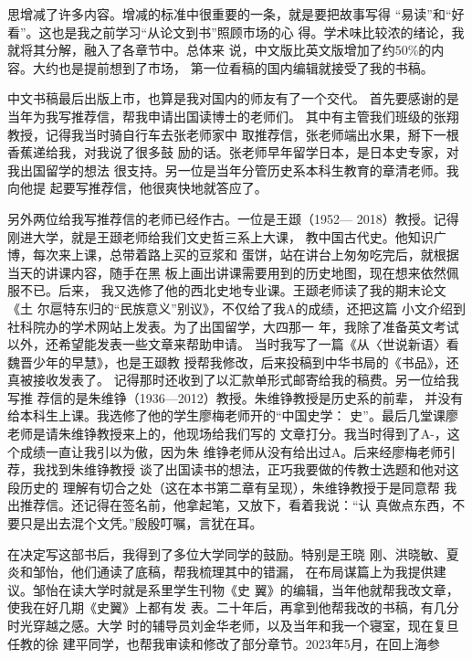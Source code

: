 思增减了许多内容。增减的标准中很重要的一条，就是要把故事写得%
“易读”和“好看”。这也是我之前学习“从论文到书”照顾市场的心%
得。学术味比较浓的绪论，我就将其分解，融入了各章节中。总体来%
说，中文版比英文版增加了约50\%的内容。大约也是提前想到了市场，%
第一位看稿的国内编辑就接受了我的书稿。%
\par
中文书稿最后出版上市，也算是我对国内的师友有了一个交代。%
首先要感谢的是当年为我写推荐信，帮我申请出国读博士的老师们。%
其中有主管我们班级的张翔教授，记得我当时骑自行车去张老师家中%
取推荐信，张老师端出水果，掰下一根香蕉递给我，对我说了很多鼓%
励的话。张老师早年留学日本，是日本史专家，对我出国留学的想法%
很支持。另一位是当年分管历史系本科生教育的章清老师。我向他提%
起要写推荐信，他很爽快地就答应了。%
\par
另外两位给我写推荐信的老师已经作古。一位是王颋（1952—%
2018）教授。记得刚进大学，就是王颋老师给我们文史哲三系上大课，%
教中国古代史。他知识广博，每次来上课，总带着路上买的豆浆和%
蛋饼，站在讲台上匆匆吃完后，就根据当天的讲课内容，随手在黑%
板上画出讲课需要用到的历史地图，现在想来依然佩服不已。后来，%
我又选修了他的西北史地专业课。王颋老师读了我的期末论文《土%
尔扈特东归的“民族意义”别议》，不仅给了我A的成绩，还把这篇%
小文介绍到社科院办的学术网站上发表。为了出国留学，大四那一%
年，我除了准备英文考试以外，还希望能发表一些文章来帮助申请。%
当时我写了一篇《从〈世说新语〉看魏晋少年的早慧》，也是王颋教%
授帮我修改，后来投稿到中华书局的《书品》，还真被接收发表了。%
记得那时还收到了以汇款单形式邮寄给我的稿费。另一位给我写推%
荐信的是朱维铮（1936—2012）教授。朱维铮教授是历史系的前辈，%
并没有给本科生上课。我选修了他的学生廖梅老师开的“中国史学：%
史”。最后几堂课廖老师是请朱维铮教授来上的，他现场给我们写的%
文章打分。我当时得到了A-，这个成绩一直让我引以为傲，因为朱%
维铮老师从没有给出过A。后来经廖梅老师引荐，我找到朱维铮教授%
谈了出国读书的想法，正巧我要做的传教士选题和他对这段历史的%
理解有切合之处（这在本书第二章有呈现），朱维铮教授于是同意帮%
我出推荐信。还记得在签名前，他拿起笔，又放下，看着我说：“认%
真做点东西，不要只是出去混个文凭。”殷殷叮嘱，言犹在耳。%
\par
在决定写这部书后，我得到了多位大学同学的鼓励。特别是王晓%
刚、洪晓敏、夏炎和邹怡，他们通读了底稿，帮我梳理其中的错漏，%
在布局谋篇上为我提供建议。邹怡在读大学时就是系里学生刊物《史%
翼》的编辑，当年他就帮我改文章，使我在好几期《史翼》上都有发%
表。二十年后，再拿到他帮我改的书稿，有几分时光穿越之感。大学%
时的辅导员刘金华老师，以及当年和我一个寝室，现在复旦任教的徐%
建平同学，也帮我审读和修改了部分章节。2023年5月，在回上海参%
